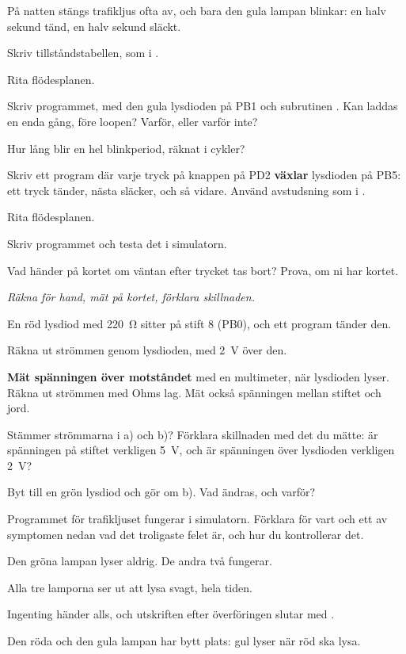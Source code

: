 \label{c11:ex:7}
På natten stängs trafikljus ofta av, och bara den gula lampan blinkar: en halv sekund tänd, en
halv sekund släckt.
\begin{parts}
  \item Skriv tillståndstabellen, som i .
  \item Rita flödesplanen.
  \item Skriv programmet, med den gula lysdioden på PB1 och subrutinen . Kan
     laddas en enda gång, före loopen? Varför, eller varför inte?
  \item Hur lång blir en hel blinkperiod, räknat i cykler?
\end{parts}

\label{c11:ex:8}
Skriv ett program där varje tryck på knappen på PD2 \textbf{växlar} lysdioden på PB5: ett tryck
tänder, nästa släcker, och så vidare. Använd avstudsning som i .
\begin{parts}
  \item Rita flödesplanen.
  \item Skriv programmet och testa det i simulatorn.
  \item Vad händer på kortet om väntan efter trycket tas bort? Prova, om ni har kortet.
\end{parts}

\label{c11:ex:9}
\emph{Räkna för hand, mät på kortet, förklara skillnaden.}

En röd lysdiod med 220~Ω sitter på stift 8 (PB0), och ett program tänder den.

Räkna ut strömmen genom lysdioden, med 2~V över den.

\textbf{Mät spänningen över motståndet} med en multimeter, när lysdioden lyser. Räkna ut strömmen
med Ohms lag. Mät också spänningen mellan stiftet och jord.

Stämmer strömmarna i a) och b)? Förklara skillnaden med det du mätte: är spänningen på stiftet
verkligen 5~V, och är spänningen över lysdioden verkligen 2~V?

Byt till en grön lysdiod och gör om b). Vad ändras, och varför?

\label{c11:ex:10}
Programmet för trafikljuset fungerar i simulatorn. Förklara för vart och ett av symptomen nedan
vad det troligaste felet är, och hur du kontrollerar det.
\begin{parts}
  \item Den gröna lampan lyser aldrig. De andra två fungerar.
  \item Alla tre lamporna ser ut att lysa svagt, hela tiden.
  \item Ingenting händer alls, och utskriften efter överföringen slutar med
    .
  \item Den röda och den gula lampan har bytt plats: gul lyser när röd ska lysa.
\end{parts}

